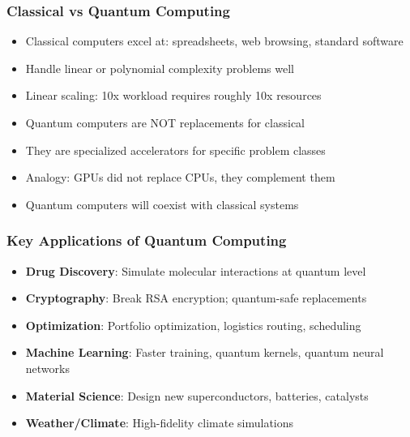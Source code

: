 \begin{frame}[fragile]\frametitle{Classical vs Quantum Computing}
\begin{itemize}
\item Classical computers excel at: spreadsheets, web browsing, standard software
\item Handle linear or polynomial complexity problems well
\item Linear scaling: 10x workload requires roughly 10x resources
\item Quantum computers are NOT replacements for classical
\item They are specialized accelerators for specific problem classes
\item Analogy: GPUs did not replace CPUs, they complement them
\item Quantum computers will coexist with classical systems
\end{itemize}
\end{frame}

\begin{frame}[fragile]\frametitle{Key Applications of Quantum Computing}
\begin{itemize}
\item \textbf{Drug Discovery}: Simulate molecular interactions at quantum level
\item \textbf{Cryptography}: Break RSA encryption; quantum-safe replacements
\item \textbf{Optimization}: Portfolio optimization, logistics routing, scheduling
\item \textbf{Machine Learning}: Faster training, quantum kernels, quantum neural networks
\item \textbf{Material Science}: Design new superconductors, batteries, catalysts
\item \textbf{Weather/Climate}: High-fidelity climate simulations
\end{itemize}
\end{frame}


